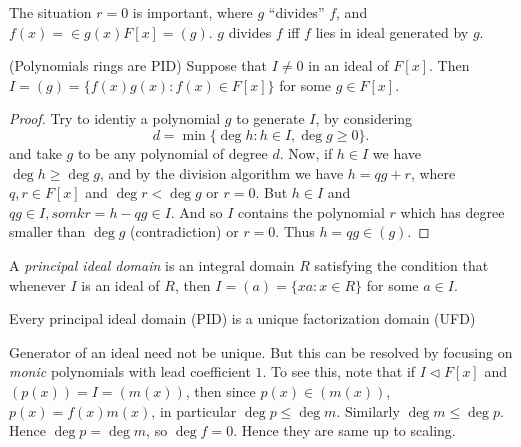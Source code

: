 
\begin{remark}
	The situation $r = 0$ is important, where $g$ ``divides'' $f$, and $f(x) = \in g(x) F[x] = (g)$. $g$ divides $f$ iff $f$ lies in ideal generated by $g$.
\end{remark}
\begin{theorem}(Polynomials rings are PID)
	Suppose that $I\neq 0$ in an ideal of $F[x]$. Then  $I = (g) = \{f(x)g(x): f(x) \in F[x]\} $ for some $g \in F[x]$.
\end{theorem}
\begin{proof}
	Try to identiy a polynomial $g$ to generate $I$, by considering 
	\[
		d = \min \{\operatorname{deg} h: h \in I, \operatorname{deg} g \ge 0\} 
	.\] 
	and take $g$ to be any polynomial of degree $d$. Now, if $h \in I$ we have $\operatorname{deg} h \ge \operatorname{deg} g$, and by the division algorithm we have $h = q g + r$, where $q, r \in F[x]$ and $\operatorname{deg} r < \operatorname{deg} g$ or $r = 0$. But $h \in I$ and $q g \in I, so mkr = h - q g \in I$. 
	And so $I$ contains the polynomial $r$ which has degree smaller than $\operatorname{deg}  g$ (contradiction) or $r = 0$. Thus $h = q g \in (g)$.
\end{proof}

\begin{definition}
	A \textit{principal  ideal domain} is an integral domain $R$ satisfying the condition that whenever $I$ is an ideal of $R$, then $I = (a) = \{xa: x \in R\}$ for some $a \in I$.
\end{definition}

\begin{remark}
	Every principal ideal domain (PID) is a unique factorization domain (UFD)
\end{remark}
\begin{remark}
	Generator of an ideal need not be unique. But this can be resolved by focusing on \textit{monic} polynomials with lead coefficient $1$. To see this, note that if $I \triangleleft F[x]$ and $\left( p(x) \right)  = I = \left( m(x) \right) $, then since  $p(x) \in \left( m(x) \right) $, $p(x) = f(x) m(x)$, in particular  $\operatorname{deg}p \le  \operatorname{deg} m$. Similarly $\operatorname{deg} m \le \operatorname{deg}  p$. Hence $\operatorname{deg} p = \operatorname{deg}  m$, so $\operatorname{deg} f = 0$. Hence they are same up to scaling.
\end{remark}

